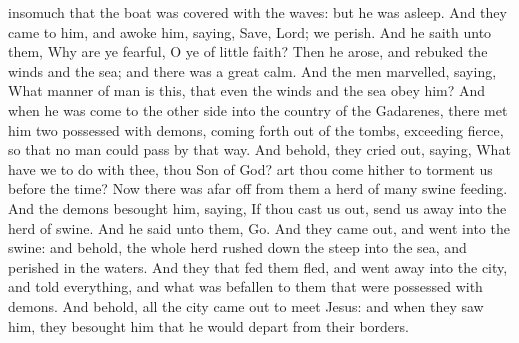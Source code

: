 insomuch that the boat was covered with the waves: but he was asleep. And they came to him, and awoke him, saying, Save, Lord; we perish. And he saith unto them, Why are ye fearful, O ye of little faith? Then he arose, and rebuked the winds and the sea; and there was a great calm. And the men marvelled, saying, What manner of man is this, that even the winds and the sea obey him?  And when he was come to the other side into the country of the Gadarenes, there met him two possessed with demons, coming forth out of the tombs, exceeding fierce, so that no man could pass by that way. And behold, they cried out, saying, What have we to do with thee, thou Son of God? art thou come hither to torment us before the time? Now there was afar off from them a herd of many swine feeding. And the demons besought him, saying, If thou cast us out, send us away into the herd of swine. And he said unto them, Go. And they came out, and went into the swine: and behold, the whole herd rushed down the steep into the sea, and perished in the waters. And they that fed them fled, and went away into the city, and told everything, and what was befallen to them that were possessed with demons. And behold, all the city came out to meet Jesus: and when they saw him, they besought him that he would depart from their borders. 

